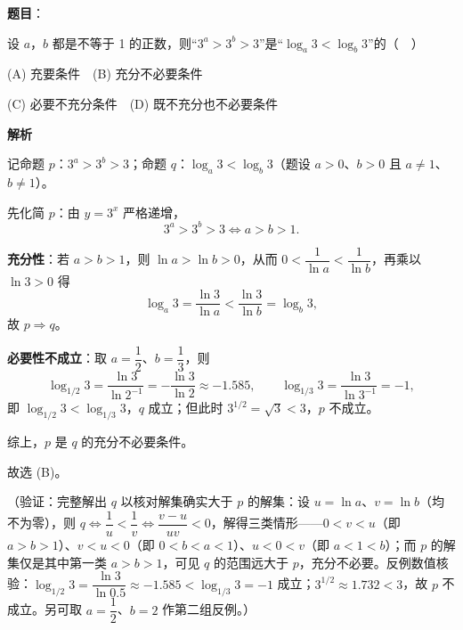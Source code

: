 \begin{answer}

\textbf{题目}：

设 \(a\)，\(b\) 都是不等于 1 的正数，则“\(3^a>3^b>3\)”是“\(\log_a 3<\log_b 3\)”的（　）

(A) 充要条件　(B) 充分不必要条件

(C) 必要不充分条件　(D) 既不充分也不必要条件

\textbf{解析}

记命题 \(p\)：\(3^a>3^b>3\)；命题 \(q\)：\(\log_a 3<\log_b 3\)（题设 \(a>0\)、\(b>0\) 且 \(a\neq1\)、\(b\neq1\)）。

先化简 \(p\)：由 \(y=3^x\) 严格递增，
\nopagebreak[4]
\[
3^a>3^b>3\iff a>b>1 .
\]

\textbf{充分性}：若 \(a>b>1\)，则 \(\ln a>\ln b>0\)，从而 \(0<\dfrac{1}{\ln a}<\dfrac{1}{\ln b}\)，再乘以 \(\ln 3>0\) 得
\nopagebreak[4]
\[
\log_a 3=\dfrac{\ln 3}{\ln a}<\dfrac{\ln 3}{\ln b}=\log_b 3 ,
\]
故 \(p\Rightarrow q\)。

\textbf{必要性不成立}：取 \(a=\dfrac{1}{2}\)、\(b=\dfrac{1}{3}\)，则
\nopagebreak[4]
\[
\log_{1/2} 3=\dfrac{\ln 3}{\ln 2^{-1}}=-\dfrac{\ln 3}{\ln 2}\approx-1.585,\qquad \log_{1/3} 3=\dfrac{\ln 3}{\ln 3^{-1}}=-1,
\]
即 \(\log_{1/2} 3<\log_{1/3} 3\)，\(q\) 成立；但此时 \(3^{1/2}=\sqrt{3}<3\)，\(p\) 不成立。

综上，\(p\) 是 \(q\) 的充分不必要条件。

故选 (B)。

（验证：完整解出 \(q\) 以核对解集确实大于 \(p\) 的解集：设 \(u=\ln a\)、\(v=\ln b\)（均不为零），则 \(q\iff\dfrac{1}{u}<\dfrac{1}{v}\iff\dfrac{v-u}{uv}<0\)，解得三类情形——\(0<v<u\)（即 \(a>b>1\)）、\(v<u<0\)（即 \(0<b<a<1\)）、\(u<0<v\)（即 \(a<1<b\)）；而 \(p\) 的解集仅是其中第一类 \(a>b>1\)，可见 \(q\) 的范围远大于 \(p\)，充分不必要。反例数值核验：\(\log_{1/2} 3=\dfrac{\ln 3}{\ln 0.5}\approx-1.585<\log_{1/3} 3=-1\) 成立；\(3^{1/2}\approx1.732<3\)，故 \(p\) 不成立。另可取 \(a=\dfrac{1}{2}\)、\(b=2\) 作第二组反例。）


\end{answer}
